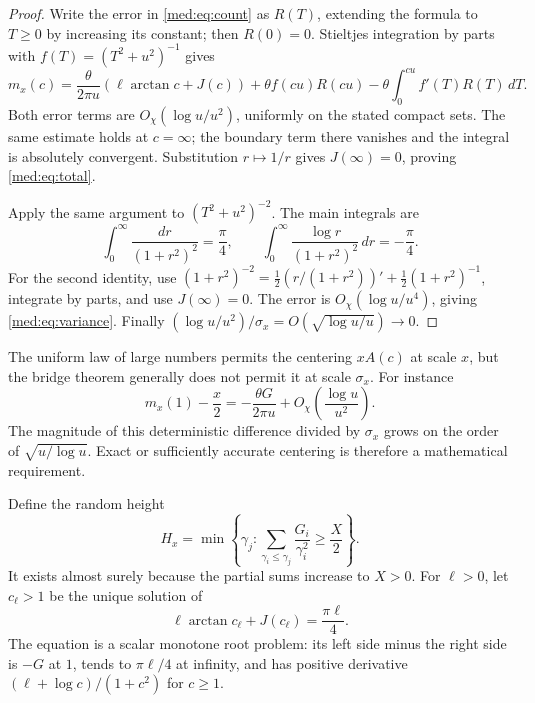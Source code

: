 \begin{proof}
Write the error in \eqref{med:eq:count} as $R(T)$, extending the formula
to $T\ge0$ by increasing its constant; then $R(0)=0$. Stieltjes
integration by parts with $f(T)=(T^2+u^2)^{-1}$ gives
\[
 m_x(c)=\frac{\theta}{2\pi u}
       (\ell\arctan c+J(c))
       +\theta f(cu)R(cu)-\theta\int_0^{cu}f'(T)R(T)\,dT.
\]
Both error terms are $O_\chi(\log u/u^2)$, uniformly on the stated
compact sets. The same estimate holds at $c=\infty$; the boundary term
there vanishes and the integral is absolutely convergent. Substitution
$r\mapsto1/r$ gives $J(\infty)=0$, proving \eqref{med:eq:total}.

Apply the same argument to $(T^2+u^2)^{-2}$. The main integrals are
\[
 \int_0^\infty\frac{dr}{(1+r^2)^2}=\frac\pi4,
 \qquad
 \int_0^\infty\frac{\log r}{(1+r^2)^2}\,dr=-\frac\pi4.
\]
For the second identity, use
$(1+r^2)^{-2}=\tfrac12(r/(1+r^2))'+\tfrac12(1+r^2)^{-1}$,
integrate by parts, and use $J(\infty)=0$. The error is
$O_\chi(\log u/u^4)$, giving \eqref{med:eq:variance}.
Finally
$(\log u/u^2)/\sigma_x=O(\sqrt{\log u/u})\to0$.
\end{proof}

\begin{remark}
The uniform law of large numbers permits the centering $xA(c)$ at scale
$x$, but the bridge theorem generally does not permit it at scale
$\sigma_x$. For instance
\[
 m_x(1)-\frac x2=-\frac{\theta G}{2\pi u}
                    +O_\chi\left(\frac{\log u}{u^2}\right).
\]
The magnitude of this deterministic difference divided by $\sigma_x$
grows on the order of $\sqrt{u/\log u}$. Exact or sufficiently accurate
centering is therefore a mathematical requirement.
\end{remark}

Define the random height
\begin{equation}\label{med:eq:height}
 H_x=\min\left\{\gamma_j:
        \sum_{\gamma_i\le\gamma_j}\frac{G_i}{\gamma_i^2}
                 \ge\frac X2\right\}.
\end{equation}
It exists almost surely because the partial sums increase to $X>0$.
For $\ell>0$, let $c_\ell>1$ be the unique solution of
\begin{equation}\label{med:eq:centerroot}
 \ell\arctan c_\ell+J(c_\ell)=\frac{\pi\ell}{4}.
\end{equation}
The equation is a scalar monotone root problem: its left side minus
the right side is $-G$ at $1$, tends to $\pi\ell/4$ at infinity, and has
positive derivative $(\ell+\log c)/(1+c^2)$ for $c\ge1$.

